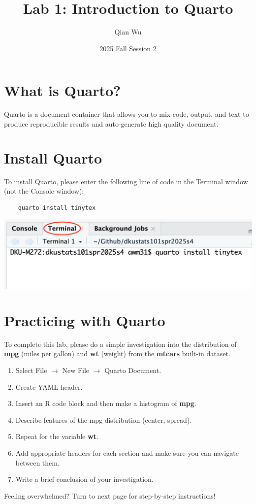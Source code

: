 \documentclass[12pt]{article}
\begin{document}
\title{Lab 1: Introduction to Quarto}
\author{Qian Wu}
\date{2025 Fall Session 2}

\maketitle
\section{What is Quarto?}
Quarto is a document container that allows you to mix code, output, and text to produce reproducible results and auto-generate high quality document. 

\section{Install Quarto}
To install Quarto, please enter the following line of code in the Terminal window (not the Console window):    
\begin{verbatim}
    quarto install tinytex
\end{verbatim}
\begin{center}
    \includegraphics[scale=0.3]{Terminal.png}
\end{center}


\section{Practicing with Quarto}
To complete this lab, please do a simple investigation into the distribution of \textbf{mpg} (miles per gallon) and \textbf{wt} (weight) from the \textbf{mtcars} built-in dataset.
\begin{enumerate}
    \item Select File $\rightarrow$ New File $\rightarrow$ Quarto Document. 
    \item Create YAML header.
    \item Insert an R code block and then make a histogram of \textbf{mpg}.
    \item Describe features of the mpg distribution (center, spread).
    \item Repeat for the variable \textbf{wt}.
    \item Add appropriate headers for each section and make sure you can navigate between them.
    \item Write a brief conclusion of your investigation.
\end{enumerate}
Feeling overwhelmed? Turn to next page for step-by-step instructions!
\end{document}
